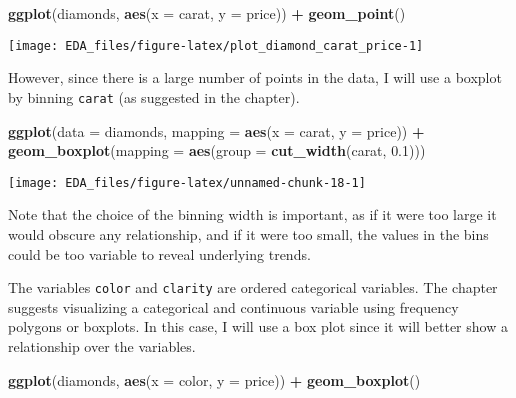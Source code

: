 \documentclass[]{book}
\newenvironment{Shaded}{\begin{snugshade}}{\end{snugshade}}
\newcommand{\DataTypeTok}[1]{\textcolor[rgb]{0.13,0.29,0.53}{#1}}
\newcommand{\FloatTok}[1]{\textcolor[rgb]{0.00,0.00,0.81}{#1}}
\newcommand{\KeywordTok}[1]{\textcolor[rgb]{0.13,0.29,0.53}{\textbf{#1}}}
\newcommand{\NormalTok}[1]{#1}
\newcommand{\OperatorTok}[1]{\textcolor[rgb]{0.81,0.36,0.00}{\textbf{#1}}}
\newcommand{\StringTok}[1]{\textcolor[rgb]{0.31,0.60,0.02}{#1}}
\theoremstyle{plain}
\theoremstyle{remark}
\theoremstyle{definition}
\theoremstyle{definition}
\theoremstyle{definition}
\theoremstyle{remark}
\begin{document}
\begin{Shaded}
\begin{Highlighting}[]
\KeywordTok{ggplot}\NormalTok{(diamonds, }\KeywordTok{aes}\NormalTok{(}\DataTypeTok{x =}\NormalTok{ carat, }\DataTypeTok{y =}\NormalTok{ price)) }\OperatorTok{+}
\StringTok{  }\KeywordTok{geom_point}\NormalTok{()}
\end{Highlighting}
\end{Shaded}

\begin{center}\texttt{[image: EDA\_files/figure-latex/plot\_diamond\_carat\_price-1]} \end{center}

However, since there is a large number of points in the data, I will use
a boxplot by binning \texttt{carat} (as suggested in the chapter).

\begin{Shaded}
\begin{Highlighting}[]
\KeywordTok{ggplot}\NormalTok{(}\DataTypeTok{data =}\NormalTok{ diamonds, }\DataTypeTok{mapping =} \KeywordTok{aes}\NormalTok{(}\DataTypeTok{x =}\NormalTok{ carat, }\DataTypeTok{y =}\NormalTok{ price)) }\OperatorTok{+}\StringTok{ }
\StringTok{  }\KeywordTok{geom_boxplot}\NormalTok{(}\DataTypeTok{mapping =} \KeywordTok{aes}\NormalTok{(}\DataTypeTok{group =} \KeywordTok{cut_width}\NormalTok{(carat, }\FloatTok{0.1}\NormalTok{)))}
\end{Highlighting}
\end{Shaded}

\begin{center}\texttt{[image: EDA\_files/figure-latex/unnamed-chunk-18-1]} \end{center}

Note that the choice of the binning width is important, as if it were
too large it would obscure any relationship, and if it were too small,
the values in the bins could be too variable to reveal underlying
trends.

The variables \texttt{color} and \texttt{clarity} are ordered
categorical variables. The chapter suggests visualizing a categorical
and continuous variable using frequency polygons or boxplots. In this
case, I will use a box plot since it will better show a relationship
over the variables.

\begin{Shaded}
\begin{Highlighting}[]
\KeywordTok{ggplot}\NormalTok{(diamonds, }\KeywordTok{aes}\NormalTok{(}\DataTypeTok{x =}\NormalTok{ color, }\DataTypeTok{y =}\NormalTok{ price)) }\OperatorTok{+}
\StringTok{  }\KeywordTok{geom_boxplot}\NormalTok{()}
\end{Highlighting}
\end{Shaded}
\end{document}
